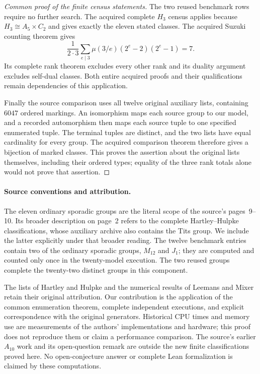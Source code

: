 \documentclass[11pt,a4paper]{article}
\begin{document}
\begin{proof}[Common proof of the finite census statements]
The two reused benchmark rows require no further search. The acquired
complete $H_3$ census applies because $H_3\cong A_5\times C_2$ and gives
exactly the eleven stated classes. The acquired Suzuki counting theorem
gives
\[
 \frac{1}{2\cdot3}\sum_{e\mid3}\mu(3/e)(2^e-2)(2^e-1)=7.
\]
Its complete rank theorem excludes every other rank and its duality
argument excludes self-dual classes. Both entire acquired proofs and
their qualifications remain dependencies of this application.

Finally the source comparison uses all twelve original auxiliary lists,
containing $6047$ ordered markings. An isomorphism maps each source group
to our model, and a recorded automorphism then maps each source tuple
to one specified enumerated tuple. The terminal tuples are distinct,
and the two lists have equal cardinality for every group. The acquired
comparison theorem therefore gives a bijection of marked classes.
This proves the assertion about the original lists themselves, including
their ordered types; equality of the three rank totals alone would not
prove that assertion.
\end{proof}

\paragraph{Source conventions and attribution.}
The eleven ordinary sporadic groups are the literal scope of the source's
pages~9--10. Its broader description on page~2 refers to the complete
Hartley--Hulpke classifications, whose auxiliary archive also contains
the Tits group. We include the latter explicitly under that broader
reading. The twelve benchmark entries contain two of the ordinary
sporadic groups, $M_{12}$ and $J_1$; they are computed and counted only
once in the twenty-model execution. The two reused groups complete
the twenty-two distinct groups in this component.

The lists of Hartley and Hulpke and the numerical results of Leemans
and Mixer retain their original attribution. Our contribution is the
application of the common enumeration theorem, complete independent
executions, and explicit correspondence with the original generators.
Historical CPU times and memory use are measurements of the authors'
implementations and hardware; this proof does not reproduce them or
claim a performance comparison. The source's earlier $A_{10}$ work and
its open-question remark are outside the new finite classifications
proved here. No open-conjecture answer or complete Lean formalization
is claimed by these computations.
\end{document}
